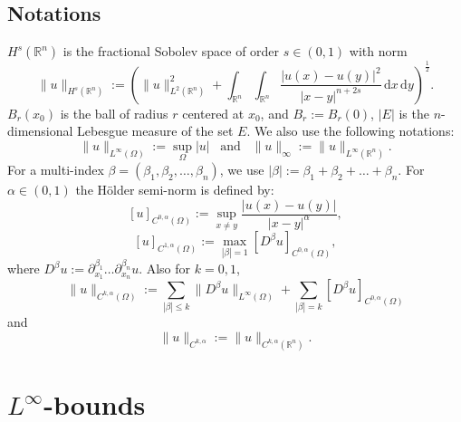 \documentclass[11pt, reqno]{amsart}
\numberwithin{equation}{section}
\numberwithin{theorem}{section}
\numberwithin{lemma}{section}
\numberwithin{corollary}{section}
\numberwithin{remark}{section}
\numberwithin{proposition}{section}
\numberwithin{definition}{section}
\newcommand{\R}{\mathbb{R}}
\begin{document}
\subsection{Notations}
$H^s(\R^n)$ is the fractional Sobolev space of order $ s\in(0,1)$ with norm 
$$
\|u\|_{H^s(\R^n)}:= \left(\|u\|_{L^2(\R^n)}^2+\int_{\R^n}\int_{\R^n}\frac{ \left|u(x)-u(y)\right|^2}{|x-y|^{n+2s}}\,\mathrm{d}x\,\mathrm{d}y\right)^{\frac12}.
$$
$B_r(x_0)$ is the ball of radius $r$ centered at $x_0$, and $B_r:=B_r(0)$, $|E|$ is the $n$-dimensional Lebesgue measure of the set $E$. We also use the following notations:
$$
\|u\|_{L^\infty(\Omega)}:=\sup_{\Omega}|u|\,\,\,\mbox{ and }\,\,\,\|u\|_\infty:=\|u\|_{L^\infty(\R^n)}.
$$
For a multi-index $\beta=(\beta_1,\beta_2,\ldots,\beta_n)$, we use $|\beta|:=\beta_1+\beta_2+\ldots+\beta_n$. For $\alpha\in(0,1)$ the H\"older semi-norm is defined by:
$$
[u]_{C^{0,\alpha}(\Omega)}:=\sup_{x\neq y}\frac{|u(x)-u(y)|}{|x-y|^\alpha},
$$
$$
[u]_{C^{1,\alpha}(\Omega)}:=\max_{|\beta|=1}[D^\beta u]_{C^{0,\alpha}(\Omega)},
$$
where $D^\beta u:=\partial_{x_1}^{\beta_1}\ldots\partial_{x_n}^{\beta_n}u$. Also for $k=0,1$,
$$
\|u\|_{C^{k,\alpha}(\Omega)}:=\sum_{|\beta|\le k}\|D^\beta u\|_{L^\infty(\Omega)}+\sum_{|\beta|=k}[D^\beta u]_{C^{0,\alpha}(\Omega)}
$$
and
$$
\|u\|_{C^{k,\alpha}}:=\|u\|_{C^{k,\alpha}(\R^n)}.
$$

\smallskip

\section{\texorpdfstring{$L^\infty$}{L-infinity}-bounds}\label{s2}
\end{document}
